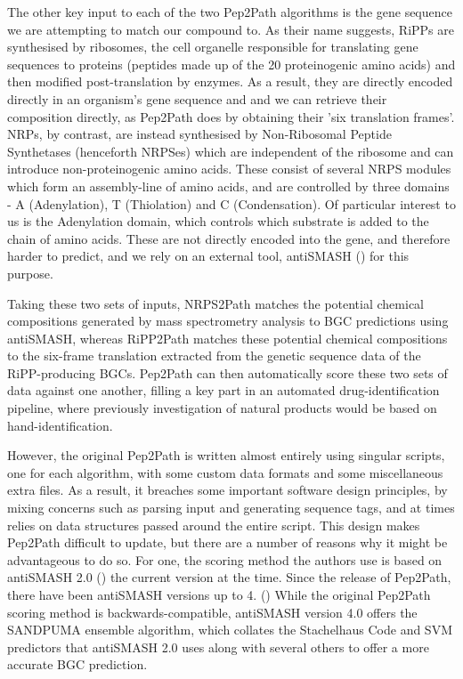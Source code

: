 \documentclass{l4proj}
\newcommand{\cit}[1]{(\cite{#1})}
\begin{document}
The other key input to each of the two Pep2Path algorithms is the gene sequence we are attempting to match our compound to. As their name suggests, RiPPs are synthesised by ribosomes, the cell organelle responsible for translating gene sequences to proteins (peptides made up of the 20 proteinogenic amino acids) and then modified post-translation by enzymes. As a result, they are directly encoded directly in an organism's gene sequence and and we can retrieve their composition directly, as Pep2Path does by obtaining their 'six translation frames'. NRPs, by contrast, are instead synthesised by Non-Ribosomal Peptide Synthetases (henceforth NRPSes) which are independent of the ribosome and can introduce non-proteinogenic amino acids. These consist of several NRPS modules which form an assembly-line of amino acids, and are controlled by three domains - A (Adenylation), T (Thiolation) and C (Condensation). Of particular interest to us is the Adenylation domain, which controls which substrate is added to the chain of amino acids. These are not directly encoded into the gene, and therefore harder to predict, and we rely on an external tool, antiSMASH \cit{as4} for this purpose.

Taking these two sets of inputs, NRPS2Path matches the potential chemical compositions generated by mass spectrometry analysis to BGC predictions using antiSMASH, whereas RiPP2Path matches these potential chemical compositions to the six-frame translation extracted from the genetic sequence data of the RiPP-producing BGCs. Pep2Path can then automatically score these two sets of data against one another, filling a key part in an automated drug-identification pipeline, where previously investigation of natural products would be based on hand-identification.

However, the original Pep2Path is written almost entirely using singular scripts, one for each algorithm, with some custom data formats and some miscellaneous extra files. As a result, it breaches some important software design principles, by mixing concerns such as parsing input and generating sequence tags, and at times relies on data structures passed around the entire script. This design makes Pep2Path difficult to update, but there are a number of reasons why it might be advantageous to do so. For one, the scoring method the authors use is based on antiSMASH 2.0 \cit{as2} the current version at the time. Since the release of Pep2Path, there have been antiSMASH versions up to 4. \cit{as4} While the original Pep2Path scoring method is backwards-compatible, antiSMASH version 4.0 offers the SANDPUMA ensemble algorithm, which collates the Stachelhaus Code and SVM predictors that antiSMASH 2.0 uses along with several others to offer a more accurate BGC prediction.
\end{document}
